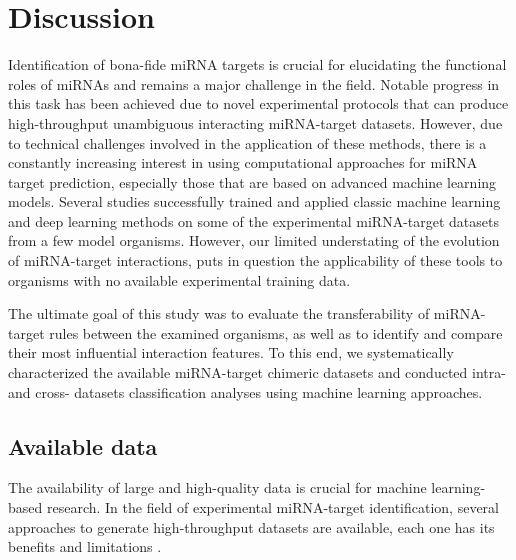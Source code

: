 \documentclass{bmcart}
\begin{document}
\clearpage
\section*{Discussion}
Identification of bona-fide miRNA targets is crucial for elucidating the functional roles of miRNAs and remains a major challenge in the field. Notable progress in this task has been achieved due to novel experimental protocols that can produce high-throughput unambiguous interacting miRNA-target datasets. However, due to technical challenges involved in the application of these methods, there is a constantly increasing interest in using computational approaches for miRNA target prediction, especially those that are based on advanced machine learning models. Several studies successfully trained and applied classic machine learning \cite{lu2016learning, ding2016tarpmir, wang2016improving, liu2019prediction} and deep learning \cite{wen2018deepmirtar, paker2019mirlstm, pla2018miraw} methods on some of the experimental miRNA-target datasets from a few model organisms. However, our limited understating of the evolution of miRNA-target interactions, puts in question the applicability of these tools to organisms with no available experimental training data.

The ultimate goal of this study was to evaluate the transferability of miRNA-target rules between the examined organisms, as well as to identify and compare their most influential interaction features. To this end, we systematically characterized the available miRNA-target chimeric datasets and conducted intra- and cross- datasets classification analyses using machine learning approaches.  

\subsection*{Available data}
The availability of large and high-quality data is crucial for machine learning-based research. In the field of experimental miRNA-target identification, several approaches to generate high-throughput datasets are available, each one has its benefits and limitations \cite{li2019current, martinez2013microrna}. 
\end{document}
